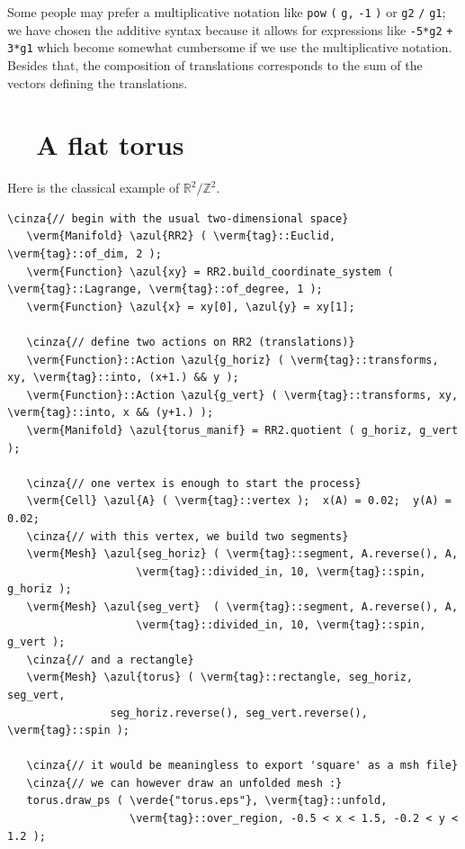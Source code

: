 Some people may prefer a multiplicative notation like {\small\tt pow} {\small\tt (} {\small\tt g,}
{\small\tt -1} {\small\tt )} or {\small\tt g2} {\small\tt /} {\small\tt g1};
we have chosen the additive syntax because it allows for expressions like {\small\tt -5*g2}
{\small\tt +} {\small\tt 3*g1} which become somewhat cumbersome if we use
the multiplicative notation.
Besides that, the composition of translations corresponds to the sum of the vectors
defining the translations.


\section{~~A flat torus}\label{\numb section 7.\numb parag 4}

Here is the classical example of $ \mathbb{R}^2/{\mathbb Z}^2 $.

\begin{Verbatim}[commandchars=\\\{\},formatcom=\small\tt,frame=single,
   label=parag-\ref{\numb section 7.\numb parag 4}.cpp,rulecolor=\color{coment},
   baselinestretch=0.94,framesep=2mm                                            ]
   \cinza{// begin with the usual two-dimensional space}
   \verm{Manifold} \azul{RR2} ( \verm{tag}::Euclid, \verm{tag}::of_dim, 2 );
   \verm{Function} \azul{xy} = RR2.build_coordinate_system ( \verm{tag}::Lagrange, \verm{tag}::of_degree, 1 );
   \verm{Function} \azul{x} = xy[0], \azul{y} = xy[1];

   \cinza{// define two actions on RR2 (translations)}
   \verm{Function}::Action \azul{g_horiz} ( \verm{tag}::transforms, xy, \verm{tag}::into, (x+1.) && y );
   \verm{Function}::Action \azul{g_vert} ( \verm{tag}::transforms, xy, \verm{tag}::into, x && (y+1.) );
   \verm{Manifold} \azul{torus_manif} = RR2.quotient ( g_horiz, g_vert );

   \cinza{// one vertex is enough to start the process}
   \verm{Cell} \azul{A} ( \verm{tag}::vertex );  x(A) = 0.02;  y(A) = 0.02;
   \cinza{// with this vertex, we build two segments}
   \verm{Mesh} \azul{seg_horiz} ( \verm{tag}::segment, A.reverse(), A,
                    \verm{tag}::divided_in, 10, \verm{tag}::spin, g_horiz );
   \verm{Mesh} \azul{seg_vert}  ( \verm{tag}::segment, A.reverse(), A,
                    \verm{tag}::divided_in, 10, \verm{tag}::spin, g_vert );
   \cinza{// and a rectangle}
   \verm{Mesh} \azul{torus} ( \verm{tag}::rectangle, seg_horiz, seg_vert,
                seg_horiz.reverse(), seg_vert.reverse(), \verm{tag}::spin );

   \cinza{// it would be meaningless to export 'square' as a msh file}
   \cinza{// we can however draw an unfolded mesh :}
   torus.draw_ps ( \verde{"torus.eps"}, \verm{tag}::unfold,
                   \verm{tag}::over_region, -0.5 < x < 1.5, -0.2 < y < 1.2 );
\end{Verbatim}

